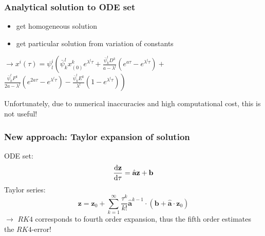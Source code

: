 \documentclass{beamer}
\newcommand{\rd}{{\rm d}}
\begin{document}
\begin{frame}[noframenumbering]
\frametitle{Analytical solution to ODE set}
\vspace{-1cm}
\begin{itemize}
	\item get homogeneous solution \newline
	\item get particular solution from variation of constants\newline
\end{itemize}

$\rightarrow x^i(\tau) =   \psi^i_l  \left(\bar{\psi}^l_k x^k_{(0)}e^{\lambda^l \tau} + \frac{\bar{\psi}^l_k D^k}{a-\lambda^l}(e^{a\tau}-e^{\lambda^l\tau}) + \right.$\\
\vspace{0.5cm}
\hspace{1.5cm}$\left. \frac{\bar{\psi}^l_k F^k}{2a-\lambda^l}(e^{2a\tau}-e^{\lambda^l\tau})-\frac{\bar{\psi}^l_k E^k}{\lambda^l}(1-e^{\lambda^l\tau}) \right)$ \newline

Unfortunately, due to numerical inaccuracies and high computational cost, this is not useful!
\end{frame}

\begin{frame}
\frametitle{New approach: Taylor expansion of solution}
\vspace{0cm}
ODE set: $$\frac{\rd \textbf{z}}{\rd \tau} = \hat{\textbf{a}}\textbf{z} + \textbf{b}$$ \newline
\vspace{0cm}
Taylor series: $$\textbf{z}=\textbf{z}_0 + \sum\limits_{k=1}^\infty \frac{\tau^k}{k!}\hat{\textbf{a}}^{k-1}\cdot (\textbf{b} + \hat{ \textbf{a}} \cdot\textbf{z}_0)$$ \newline
$\rightarrow$ $RK4$ corresponds to fourth order expansion, thus the fifth order estimates the $RK4$-error!
\end{frame}
\end{document}
